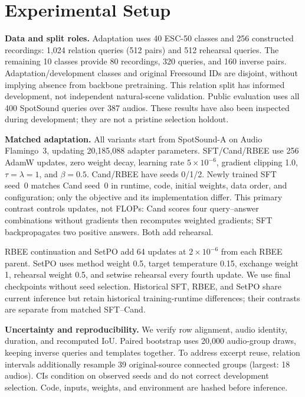 \section{Experimental Setup}
\textbf{Data and split roles.}
Adaptation uses 40 ESC-50 classes and 256 constructed recordings: 1,024 relation queries (512 pairs) and 512 rehearsal queries. The remaining 10 classes provide 80 recordings, 320 queries, and 160 inverse pairs. Adaptation/development classes and original Freesound IDs are disjoint, without implying absence from backbone pretraining. This relation split has informed development, not independent natural-scene validation. Public evaluation uses all 400 SpotSound queries over 387 audios. These results have also been inspected during development; they are not a pristine selection holdout.

\textbf{Matched adaptation.}
All variants start from SpotSound-A on Audio Flamingo~3, updating 20,185,088 adapter parameters. SFT/Cand/RBEE use 256 AdamW updates, zero weight decay, learning rate $5\times10^{-6}$, gradient clipping 1.0, $\tau=\lambda=1$, and $\beta=0.5$. Cand/RBEE have seeds 0/1/2. Newly trained SFT seed~0 matches Cand seed~0 in runtime, code, initial weights, data order, and configuration; only the objective and its implementation differ. This primary contrast controls updates, not FLOPs: Cand scores four query--answer combinations without gradients then recomputes weighted gradients; SFT backpropagates two positive answers. Both add rehearsal.

RBEE continuation and SetPO add 64 updates at $2\times10^{-6}$ from each RBEE parent. SetPO uses method weight 0.5, target temperature 0.15, exchange weight 1, rehearsal weight 0.5, and setwise rehearsal every fourth update. We use final checkpoints without seed selection. Historical SFT, RBEE, and SetPO share current inference but retain historical training-runtime differences; their contrasts are separate from matched SFT--Cand.

\textbf{Uncertainty and reproducibility.}
We verify row alignment, audio identity, duration, and recomputed IoU. Paired bootstrap uses 20,000 audio-group draws, keeping inverse queries and templates together. To address excerpt reuse, relation intervals additionally resample 39 original-source connected groups (largest: 18 audios). CIs condition on observed seeds and do not correct development selection. Code, inputs, weights, and environment are hashed before inference.
